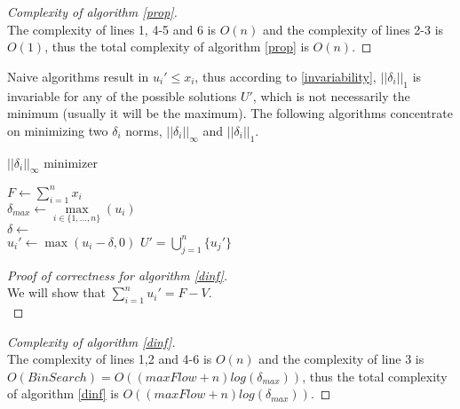 \documentclass[11pt]{article}
\theoremstyle{definition}
\theoremstyle{corollary}
\begin{document}
    \begin{proof}[Complexity of algorithm \ref{prop}] \ \\
       The complexity of lines 1, 4-5 and 6 is $O(n)$ and the complexity of lines 2-3 is $O(1)$, thus the total complexity
       of algorithm \ref{prop} is $O(n)$.
    \end{proof}
    Naive algorithms result in $u_i' \leq x_i$, thus according to \ref{invariability}, $||\delta_i||_1$ is invariable for
    any of the possible solutions $U'$, which is not necessarily the minimum (usually it will be the maximum). The following
    algorithms concentrate on minimizing two $\delta_i$ norms, $||\delta_i||_\infty$ and $||\delta_i||_1$. \\
    \begin{algorithm}[H]
       \label{dinf}
       \caption{$||\delta_i||_\infty$ minimizer}
       $F \gets \sum\limits_{i=1}^{n}x_i$ \\
       $\delta_{max} \gets \max\limits_{i \in \{1,...,n\}}{(u_i)}$ \\
       $\delta \gets$  \\
          {$u_i' \gets \max{(u_i - \delta, 0)}$}
       \Return $U' = \bigcup\limits_{j=1}^{n}\{u_j'\}$
    \end{algorithm}
    \begin{proof}[Proof of correctness for algorithm \ref{dinf}] \ \\
       We will show that $\sum\limits_{i=1}^{n}u_i' = F - V$. \\
       
    \end{proof}
    \begin{proof}[Complexity of algorithm \ref{dinf}] \ \\
       The complexity of lines 1,2 and 4-6 is $O(n)$ and the complexity of line 3 is $O(BinSearch) = O((maxFlow + n)
       log(\delta_{max}))$, thus the total complexity of algorithm \ref{dinf} is $O((maxFlow + n)log(\delta_{max}))$.
    \end{proof}
\end{document}
